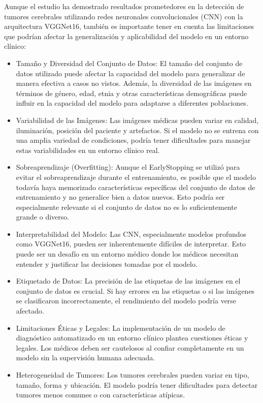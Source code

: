 \documentclass[12pt,twoside,titlepage]{ingenius}
\begin{document}
\begin{multicols}{2}
Aunque el estudio ha demostrado resultados prometedores en la detección de tumores cerebrales utilizando redes neuronales convolucionales (CNN) con la arquitectura VGGNet16, también es importante tener en cuenta las limitaciones que podrían afectar la generalización y aplicabilidad del modelo en un entorno clínico:
\begin{itemize}
	\item Tamaño y Diversidad del Conjunto de Datos: El tamaño del conjunto de datos utilizado puede afectar la capacidad del modelo para generalizar de manera efectiva a casos no vistos. Además, la diversidad de las imágenes en términos de género, edad, etnia y otras características demográficas puede influir en la capacidad del modelo para adaptarse a diferentes poblaciones.
	\item Variabilidad de las Imágenes: Las imágenes médicas pueden variar en calidad, iluminación, posición del paciente y artefactos. Si el modelo no se entrena con una amplia variedad de condiciones, podría tener dificultades para manejar estas variabilidades en un entorno clínico real.
	\item Sobreaprendizaje (Overfitting): Aunque el EarlyStopping se utilizó para evitar el sobreaprendizaje durante el entrenamiento, es posible que el modelo todavía haya memorizado características específicas del conjunto de datos de entrenamiento y no generalice bien a datos nuevos. Esto podría ser especialmente relevante si el conjunto de datos no es lo suficientemente grande o diverso.
	\item Interpretabilidad del Modelo: Las CNN, especialmente modelos profundos como VGGNet16, pueden ser inherentemente difíciles de interpretar. Esto puede ser un desafío en un entorno médico donde los médicos necesitan entender y justificar las decisiones tomadas por el modelo.
	\item Etiquetado de Datos: La precisión de las etiquetas de las imágenes en el conjunto de datos es crucial. Si hay errores en las etiquetas o si las imágenes se clasificaron incorrectamente, el rendimiento del modelo podría verse afectado.
	\item Limitaciones Éticas y Legales: La implementación de un modelo de diagnóstico automatizado en un entorno clínico plantea cuestiones éticas y legales. Los médicos deben ser cautelosos al confiar completamente en un modelo sin la supervisión humana adecuada.
	\item Heterogeneidad de Tumores: Los tumores cerebrales pueden variar en tipo, tamaño, forma y ubicación. El modelo podría tener dificultades para detectar tumores menos comunes o con características atípicas.

\end{itemize}
\end{multicols}
\end{document}
